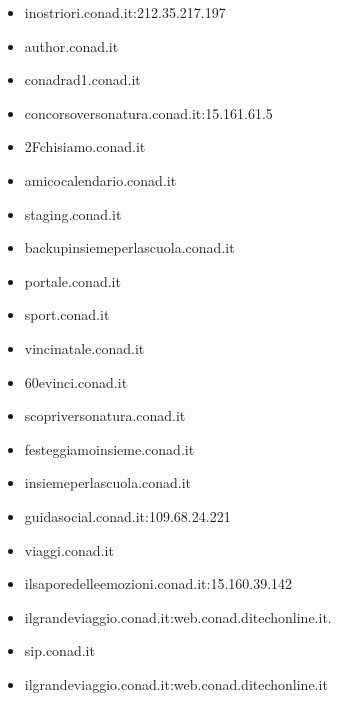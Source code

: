 \documentclass{article}
\begin{document}
\begin{itemize}
        \item inostriori.conad.it:212.35.217.197
    
        \item author.conad.it
    
        \item conadrad1.conad.it
    
        \item concorsoversonatura.conad.it:15.161.61.5
    
        \item 2Fchisiamo.conad.it
    
        \item amicocalendario.conad.it
    
        \item staging.conad.it
    
        \item backupinsiemeperlascuola.conad.it
    
        \item portale.conad.it
    
        \item sport.conad.it
    
        \item vincinatale.conad.it
    
        \item 60evinci.conad.it
    
        \item scopriversonatura.conad.it
    
        \item festeggiamoinsieme.conad.it
    
        \item insiemeperlascuola.conad.it
    
        \item guidasocial.conad.it:109.68.24.221
    
        \item viaggi.conad.it
    
        \item ilsaporedelleemozioni.conad.it:15.160.39.142
    
        \item ilgrandeviaggio.conad.it:web.conad.ditechonline.it.
    
        \item sip.conad.it
    
        \item ilgrandeviaggio.conad.it:web.conad.ditechonline.it
    

\end{itemize}
\end{document}
